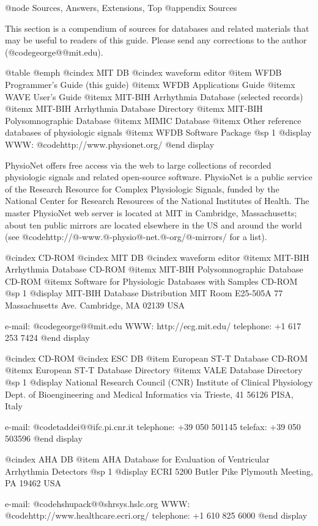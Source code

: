 {{{{{{{{{@node     Sources, Answers, Extensions, Top
@appendix Sources

This section is a compendium of sources for databases and related
materials that may be useful to readers of this guide.  Please send any
corrections to the author (@code{george@@mit.edu}).

@table @emph
@cindex MIT DB
@cindex waveform editor
@item WFDB Programmer's Guide (this guide)
@itemx WFDB Applications Guide
@itemx WAVE User's Guide
@itemx MIT-BIH Arrhythmia Database (selected records)
@itemx MIT-BIH Arrhythmia Database Directory
@itemx MIT-BIH Polysomnographic Database
@itemx MIMIC Database
@itemx Other reference databases of physiologic signals
@itemx WFDB Software Package
@sp 1
@display
WWW: @code{http://www.physionet.org/}
@end display

PhysioNet offers free access via the web to large collections of
recorded physiologic signals and related open-source software.
PhysioNet is a public service of the Research Resource for
Complex Physiologic Signals, funded by the National Center for
Research Resources of the National Institutes of Health.  The
master PhysioNet web server is located at MIT in Cambridge, Massachusetts;
about ten public mirrors are located elsewhere in the US and around
the world (see @code{http://@-www.@-physio@-net.@-org/@-mirrors/} for a list).

@cindex CD-ROM
@cindex MIT DB
@cindex waveform editor
@itemx MIT-BIH Arrhythmia Database CD-ROM
@itemx MIT-BIH Polysomnographic Database CD-ROM
@itemx Software for Physiologic Databases with Samples CD-ROM
@sp 1
@display
MIT-BIH Database Distribution
MIT Room E25-505A
77 Massachusetts Ave.
Cambridge, MA 02139 USA

e-mail: @code{george@@mit.edu}
WWW: http://ecg.mit.edu/
telephone: +1 617 253 7424
@end display

@cindex CD-ROM
@cindex ESC DB
@item European ST-T Database CD-ROM
@itemx European ST-T Database Directory
@itemx VALE Database Directory
@sp 1
@display
National Research Council (CNR) Institute of Clinical Physiology
Dept. of Bioengineering and Medical Informatics
via Trieste, 41
56126 PISA, Italy

e-mail:	@code{taddei@@ifc.pi.cnr.it}
telephone: +39 050 501145
telefax: +39 050 503596
@end display

@cindex AHA DB
@item AHA Database for Evaluation of Ventricular Arrhythmia Detectors
@sp 1
@display
ECRI
5200 Butler Pike
Plymouth Meeting, PA 19462 USA

e-mail: @code{hshupack@@shrsys.hslc.org}
WWW: @code{http://www.healthcare.ecri.org/}
telephone: +1 610 825 6000
@end display

}}}}}}}}}
